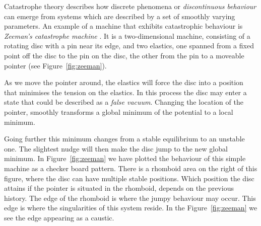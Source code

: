 \begin{subappendices}
Catastrophe theory describes how discrete phenomena or \emph{discontinuous behaviour} can emerge from systems which are described by a set of smoothly varying parameters. An example of a machine that exhibits catastrophic behaviour is \emph{Zeeman's catastrophe machine} \citep[described in][Chapter 5]{Poston1996}. It is a two-dimensional machine, consisting of a rotating disc with a pin near its edge, and two elastics, one spanned from a fixed point off the disc to the pin on the disc, the other from the pin to a moveable pointer (see Figure~\ref{fig:zeeman}).

As we move the pointer around, the elastics will force the disc into a position that minimises the tension on the elastics. In this process the disc may enter a state that could be described as a \emph{false vacuum}. Changing the location of the pointer, smoothly transforms a global minimum of the potential to a local minimum.

Going further this minimum changes from a stable equilibrium to an unstable one. The slightest nudge will then make the disc jump to the new global minimum. In Figure~\ref{fig:zeeman} we have plotted the behaviour of this simple machine as a checker board pattern. There is a rhomboid area on the right of this figure, where the disc can have multiple stable positions. Which position the disc attains if the pointer is situated in the rhomboid, depends on the previous history. The edge of the rhomboid is where the jumpy behaviour may occur. This edge is where the singularities of this system reside. In the Figure~\ref{fig:zeeman} we see the edge appearing as a caustic.
\end{subappendices}

